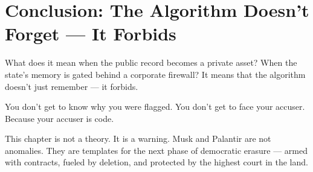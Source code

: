 \section*{Conclusion: The Algorithm Doesn’t Forget — It Forbids}
What does it mean when the public record becomes a private asset? When the state’s memory is gated behind a corporate firewall? It means that the algorithm doesn’t just remember — it forbids.

You don’t get to know why you were flagged.  
You don’t get to face your accuser.  
Because your accuser is code.

This chapter is not a theory. It is a warning.  
Musk and Palantir are not anomalies.  
They are templates for the next phase of democratic erasure — armed with contracts, fueled by deletion, and protected by the highest court in the land.
